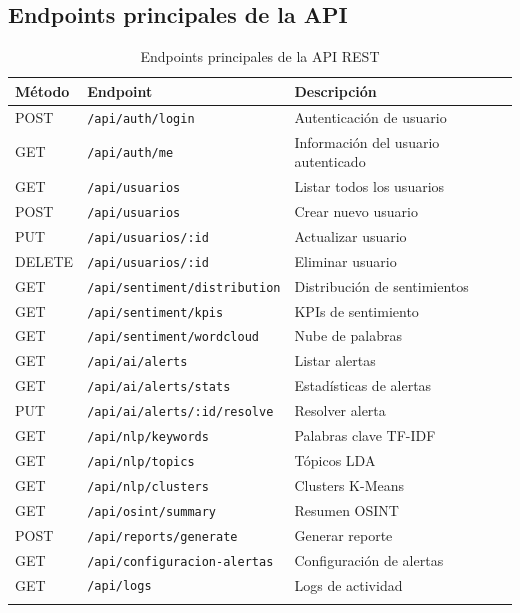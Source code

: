 \documentclass[12pt,a4paper]{article}
\begin{document}
\subsection{Endpoints principales de la API}
\begin{longtable}{l l p{6cm}}
\toprule
\textbf{Método} & \textbf{Endpoint} & \textbf{Descripción} \\
\midrule
\endhead

POST & \texttt{/api/auth/login} & Autenticación de usuario \\
GET & \texttt{/api/auth/me} & Información del usuario autenticado \\
GET & \texttt{/api/usuarios} & Listar todos los usuarios \\
POST & \texttt{/api/usuarios} & Crear nuevo usuario \\
PUT & \texttt{/api/usuarios/:id} & Actualizar usuario \\
DELETE & \texttt{/api/usuarios/:id} & Eliminar usuario \\
GET & \texttt{/api/sentiment/distribution} & Distribución de sentimientos \\
GET & \texttt{/api/sentiment/kpis} & KPIs de sentimiento \\
GET & \texttt{/api/sentiment/wordcloud} & Nube de palabras \\
GET & \texttt{/api/ai/alerts} & Listar alertas \\
GET & \texttt{/api/ai/alerts/stats} & Estadísticas de alertas \\
PUT & \texttt{/api/ai/alerts/:id/resolve} & Resolver alerta \\
GET & \texttt{/api/nlp/keywords} & Palabras clave TF-IDF \\
GET & \texttt{/api/nlp/topics} & Tópicos LDA \\
GET & \texttt{/api/nlp/clusters} & Clusters K-Means \\
GET & \texttt{/api/osint/summary} & Resumen OSINT \\
POST & \texttt{/api/reports/generate} & Generar reporte \\
GET & \texttt{/api/configuracion-alertas} & Configuración de alertas \\
GET & \texttt{/api/logs} & Logs de actividad \\

\bottomrule
\caption{Endpoints principales de la API REST}
\end{longtable}

\end{document}
